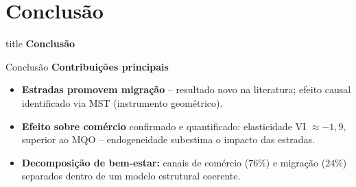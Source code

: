 
\section{Conclusão}

\begin{frame}[plain]
    \vfill
    \centering
    \begin{beamercolorbox}[sep=12pt,center,shadow=false,rounded=true]{title}
        {\Large\bfseries Conclusão}
    \end{beamercolorbox}
    \vfill
\end{frame}

\begin{frame}{Conclusão}
    \textbf{Contribuições principais}
    \begin{itemize}
        \item \textbf{Estradas promovem migração} -- resultado novo na literatura; efeito causal identificado via MST (instrumento geométrico).
        \item \textbf{Efeito sobre comércio} confirmado e quantificado: elasticidade VI $\approx -1{,}9$, superior ao MQO -- endogeneidade subestima o impacto das estradas.
        \item \textbf{Decomposição de bem-estar:} canais de comércio ($76\%$) e migração ($24\%$) separados dentro de um modelo estrutural coerente.
    \end{itemize}
\end{frame}